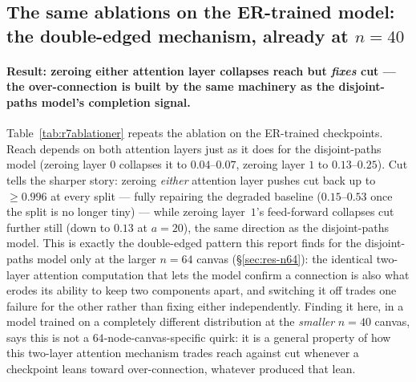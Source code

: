 \documentclass[11pt,a4paper]{article}
\begin{document}
\subsection{The same ablations on the ER-trained model: the double-edged mechanism, already at $n=40$}
\label{sec:res-ablation-er}

\paragraph{Result: zeroing either attention layer collapses reach but \emph{fixes} cut ---
the over-connection is built by the same machinery as the disjoint-paths model's completion
signal.} Table~\ref{tab:r7ablationer} repeats the ablation on the ER-trained checkpoints.
Reach depends on both attention layers just as it does for the disjoint-paths model (zeroing
layer $0$ collapses it to $0.04$--$0.07$, zeroing layer $1$ to $0.13$--$0.25$). Cut tells the
sharper story: zeroing \emph{either} attention layer pushes cut back up to $\ge0.996$ at every
split --- fully repairing the degraded baseline ($0.15$--$0.53$ once the split is no longer
tiny) --- while zeroing layer~$1$'s feed-forward collapses cut further still (down to $0.13$
at $a=20$), the same direction as the disjoint-paths model. This is exactly the
double-edged pattern this report finds for the disjoint-paths model only at the larger
$n=64$ canvas (\S\ref{sec:res-n64}): the identical two-layer attention computation that lets
the model confirm a connection is also what erodes its ability to keep two components
apart, and switching it off trades one failure for the other rather than fixing either
independently. Finding it here, in a model trained on a completely different distribution at
the \emph{smaller} $n=40$ canvas, says this is not a $64$-node-canvas-specific quirk: it is a
general property of how this two-layer attention mechanism trades reach against cut whenever
a checkpoint leans toward over-connection, whatever produced that lean.
\end{document}
